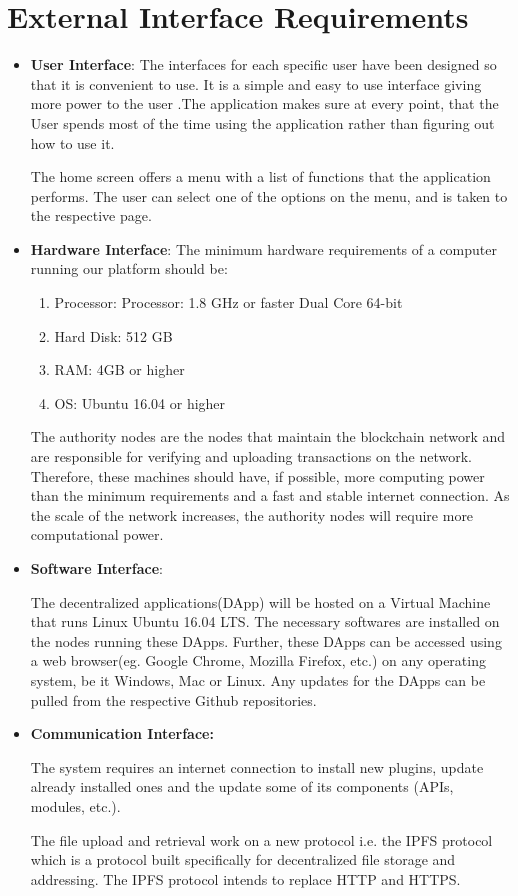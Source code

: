 \section{External Interface Requirements}
\begin{itemize}
	\item  \textbf{User Interface}:
	      The interfaces for each specific user have been designed so that it is convenient to use. It is a simple and easy to use interface giving more power to the user .The application makes sure at every point, that the User spends most of the time using the application rather than figuring out how to use it.
	      	          
	      The home screen offers a menu with a list of functions that the application performs. The user can select one of the options on the menu, and is taken to the respective page.
	      	          
	\item \textbf{Hardware Interface}: \newline
	      The minimum hardware requirements of a computer running our platform should be:
	      \begin{enumerate}
	      	\item Processor: Processor: 1.8 GHz or faster Dual Core 64-bit 
	      	\item Hard Disk: 512 GB
	      	\item RAM: 4GB or higher
	      	\item OS: Ubuntu 16.04 or higher
	      \end{enumerate}
	      	      
	      The authority nodes are the nodes that maintain the blockchain network and are responsible for verifying and uploading transactions on the network. Therefore, these machines should have, if possible, more computing power than the minimum requirements and a fast and stable internet connection. As the scale of the network increases, the authority nodes will require more computational power.
	\item \textbf{Software Interface}:
	      	      
	      The decentralized applications(DApp) will be hosted on a Virtual Machine that runs Linux Ubuntu 16.04 LTS. The necessary softwares are installed on the nodes running these DApps. Further, these DApps can be accessed using a web browser(eg. Google Chrome, Mozilla Firefox, etc.) on any operating system, be it Windows, Mac or Linux. Any updates for the DApps can be pulled from the respective Github repositories.
	\item \textbf{ Communication Interface:}
	      	      
	      The system requires an internet connection to install new plugins, update already installed ones and the update some of its components (APIs, modules, etc.).
	      	          
	      The file upload and retrieval work on a new protocol i.e. the IPFS protocol which is a protocol built specifically for decentralized file storage and addressing. The IPFS protocol intends to replace HTTP and HTTPS.
	      	         
	      	         
\end{itemize}
